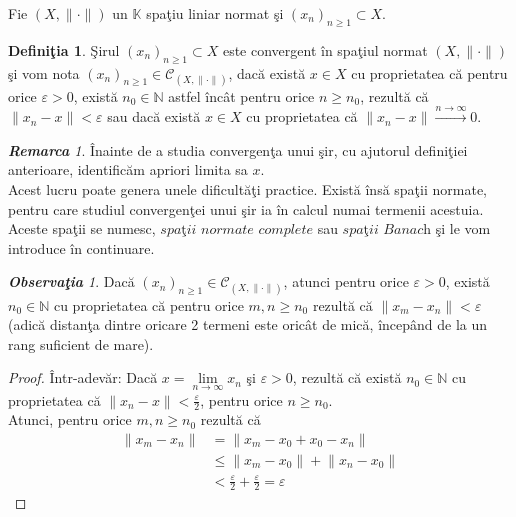 \documentclass[ a4paper, 12pt]{report}
\theoremstyle{definition}
\newtheorem{definition}{\bf Defini\c tia}[section]
\theoremstyle{remark}
\newtheorem{remarc}{\bf Remarca}[section]
\newtheorem{obs}{\bf Observa\c tia }[section]
\numberwithin{equation}{section}
\begin{document}
Fie $(X, \lVert \cdot \rVert)$ un $\mathbb{K}$ spa\c tiu  liniar normat \c si $(x_n)_{n \geq 1} \subset X.$\\
\begin{definition}
\c Sirul $(x_n)_{n \geq 1} \subset X$ este convergent \^in spa\c tiul normat $(X, \lVert \cdot \rVert)$ \c si vom nota $(x_n)_{n \geq 1} \in \mathcal{C}_{(X, \lVert \cdot \rVert)}$,  dac\u a exist\u a $x \in X$  cu proprietatea c\u a pentru orice $\varepsilon>0$, exist\u a $ n_0 \in \mathbb{N}$ astfel \^inc\^at pentru orice $n \geq n_0$, rezult\u a c\u a $\lVert x_n - x \rVert < \varepsilon$ sau dac\u a exist\u a $x \in X$ cu proprietatea c\u a $\lVert x_n - x \rVert \stackrel{n \rightarrow \infty}{\longrightarrow } 0$.
\end{definition}
\begin{remarc}
\^Inainte de a studia convergen\c ta unui \c sir, cu ajutorul defini\c tiei anterioare, identific\u am  apriori limita sa $x$.\\
Acest lucru poate genera unele dificult\u a\c ti practice. Exist\u a \^ins\u a spa\c tii normate, pentru care studiul convergen\c tei unui \c sir ia \^in calcul numai termenii acestuia. Aceste spa\c tii se numesc,$\textit{ spa\c tii normate complete}$ sau $\textit{spa\c tii Banach}$ \c si le vom introduce \^in continuare.
\end{remarc}
\begin{obs}
Dac\u a $(x_n)_{n \geq 1} \in \mathcal{C}_{(X, \lVert \cdot \rVert)}$, atunci pentru orice $\varepsilon >0$, exist\u a $n_0 \in \mathbb{N}$ cu proprietatea c\u a pentru orice $m,n \geq n_0$ rezult\u a  c\u a $\lVert x_m - x_n \rVert < \varepsilon $ (adic\u a distan\c ta dintre oricare 2 termeni este oric\^at de mic\u a, \^incep\^and de la un rang suficient de mare).
\end{obs}
\begin{proof}
\^Intr-adev\u ar: Dac\u a  $x = \lim\limits_{n \rightarrow \infty} x_n$ \c si $\varepsilon>0$, rezult\u a c\u a exist\u a $n_0 \in \mathbb{N}$ cu proprietatea c\u a $\lVert x_n - x \rVert < \frac{\varepsilon}{2}$, pentru orice $n \geq n_0.$\\
Atunci, pentru orice $m,n \geq n_0$ rezult\u a c\u a
\begin{align*}
\lVert x_m - x_n \rVert
&=\lVert x_m - x_0+x_0-x_n \rVert\\ & \leq \lVert x_m - x_0 \rVert +  \lVert x_n - x_0 \rVert \\ 
&<\frac{\varepsilon}{2}+\frac{\varepsilon}{2} = \varepsilon
\end{align*} 
\end{proof}
\end{document}
